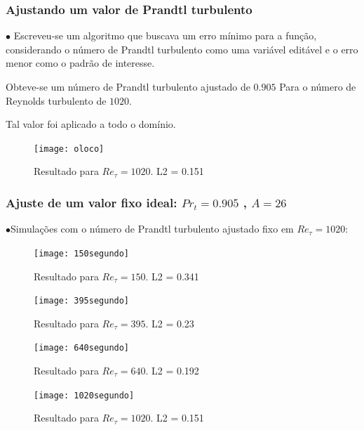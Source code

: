 \documentclass[xcolor=dvipsnames,10pt,aspectratio=169]{beamer}
\begin{document}
	
		\begin{frame}
		\frametitle{Ajustando um valor de Prandtl turbulento}
		\begin{minipage}[h!]{0.45\textwidth}
			$\bullet$ Escreveu-se um algoritmo que buscava um erro mínimo para a função, considerando o número de Prandtl turbulento como uma variável editável e o erro menor como o padrão de interesse. 
			
			Obteve-se um número de Prandtl turbulento ajustado de $ 0.905 $ Para o número de Reynolds turbulento de $1020$.
			
			Tal valor foi aplicado a todo o domínio.
		\end{minipage}
			\begin{minipage}[h!]{0.2\textwidth}
			\end{minipage}
			\begin{minipage}[h!]{0.45\textwidth}
			\begin{figure}
				\centering
				\texttt{[image: oloco]}
				\caption{Resultado para $Re_\tau = 1020$. L2 = 0.151}
			\end{figure}
		\end{minipage}	
		\end{frame}
		
		
		
		
		
		\begin{frame}
		\frametitle{Ajuste de um valor fixo ideal: $Pr_t = 0.905$ , $A = 26$}
		$\bullet$Simulações com o número de Prandtl turbulento ajustado fixo em $Re_\tau = 1020$:  \\
		\begin{minipage}[h!]{0.45\textwidth}
			 \begin{figure}
			 	\centering
			 	\texttt{[image: 150segundo]}
			 	\caption{Resultado para $Re_\tau = 150$. L2 = 0.341}
			 \end{figure}
			 \begin{figure}
			 	\centering
			 	\texttt{[image: 395segundo]}
			 	\caption{Resultado para $Re_\tau = 395$. L2 = 0.23}
			 \end{figure}
		\end{minipage}\hfill
		\begin{minipage}[h!]{0.45\textwidth}
			\begin{figure}
				\centering
				\texttt{[image: 640segundo]}
				\caption{Resultado para $Re_\tau = 640$. L2 = 0.192}
			\end{figure}
			\begin{figure}
				\centering
				\texttt{[image: 1020segundo]}
				\caption{Resultado para $Re_\tau = 1020$. L2 = 0.151}
			\end{figure}
		\end{minipage}		
		\end{frame}	
	
\end{document}
